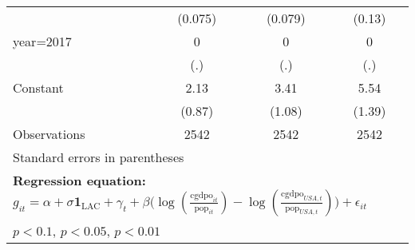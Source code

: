\begin{sidewaystable}[htbp]
\begin{tabular}{l*{3}{c}}
                &  (0.075)         &  (0.079)         &   (0.13)         \\
\addlinespace
year=2017       &        0         &        0         &        0         \\
                &      (.)         &      (.)         &      (.)         \\
\addlinespace
Constant        &     2.13\sym{**} &     3.41\sym{***}&     5.54\sym{***}\\
                &   (0.87)         &   (1.08)         &   (1.39)         \\
\midrule
Observations    &     2542         &     2542         &     2542         \\
\bottomrule
\multicolumn{4}{l}{\footnotesize Standard errors in parentheses}\\
\multicolumn{4}{l}{\footnotesize \textbf{Regression equation:} \(g_{it} = \alpha + \sigma \mathbf{1}_{\textrm{LAC}} + \gamma_t + \beta \big(\log (\frac{\textrm{cgdpo}_{it}}{\textrm{pop}_{it}} ) - \log (\frac{\textrm{cgdpo}_{USA,t}}{\textrm{pop}_{USA,t}}  ) \big) + \epsilon_{it}\)}\\
\multicolumn{4}{l}{\footnotesize \sym{*} \(p<0.1\), \sym{**} \(p<0.05\), \sym{***} \(p<0.01\)}\\
\end{tabular}
\end{sidewaystable}
